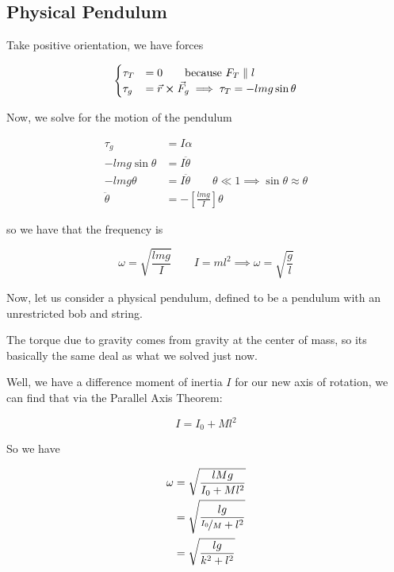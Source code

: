 \subsection{Physical Pendulum}

Take positive orientation, we have forces

\begin{equation}
	\begin{cases}
		\tau_T &= 0 \qquad \text{because } F_T \parallel l\\
		\tau_g &= \vec r \cross \vec F_g \implies\tau_T = -lmg\sin\theta
	\end{cases}
\end{equation}

Now, we solve for the motion of the pendulum

\begin{align}
	\tau_g &= I\alpha\\
	-lmg\sin\theta &= I \ddot \theta\\
	-lmg\theta &= I \ddot\theta \qquad \theta \ll 1 \implies \sin\theta \approx \theta\\
	\ddot\theta &= - \left[\frac{lmg}{I}\right] \theta
\end{align}

so we have that the frequency is

\begin{equation}
	\omega = \sqrt{\frac{lmg}{I}} \qquad I = ml^2 \implies \omega = \sqrt{\frac{g}{l}}
\end{equation}

Now, let us consider a physical pendulum, defined to be a pendulum with an unrestricted bob and string.

The torque due to gravity comes from gravity at the center of mass, so its basically the same deal as what we solved just now.

Well, we have a difference moment of inertia $I$ for our new axis of rotation, we can find that via the Parallel Axis Theorem:

\begin{equation}
	I = I_0 + Ml^2
\end{equation}

So we have

\begin{align}
	\omega &= \sqrt{\frac{lMg}{I_0 + Ml^2}}\\
	&= \sqrt{\frac{lg}{\nicefrac{I_0}{M} + l^2}}\\
	&= \sqrt{\frac{lg}{k^2 + l^2}}
\end{align}

